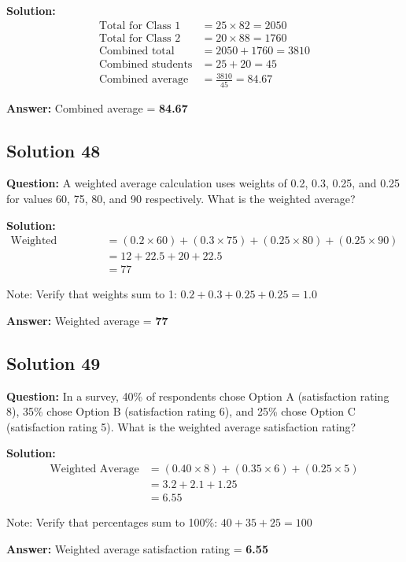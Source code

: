 \documentclass[12pt,a4paper]{article}
\begin{document}
\textbf{Solution:}
\begin{align*}
\text{Total for Class 1} &= 25 \times 82 = 2050 \\
\text{Total for Class 2} &= 20 \times 88 = 1760 \\
\text{Combined total} &= 2050 + 1760 = 3810 \\
\text{Combined students} &= 25 + 20 = 45 \\
\text{Combined average} &= \frac{3810}{45} = 84.67
\end{align*}

\textbf{Answer:} Combined average = \textbf{84.67}

\subsection*{Solution 48}
\textbf{Question:} A weighted average calculation uses weights of 0.2, 0.3, 0.25, and 0.25 for values 60, 75, 80, and 90 respectively. What is the weighted average?

\textbf{Solution:}
\begin{align*}
\text{Weighted Average} &= (0.2 \times 60) + (0.3 \times 75) + (0.25 \times 80) + (0.25 \times 90) \\
&= 12 + 22.5 + 20 + 22.5 \\
&= 77
\end{align*}

Note: Verify that weights sum to 1: $0.2 + 0.3 + 0.25 + 0.25 = 1.0$ 

\textbf{Answer:} Weighted average = \textbf{77}

\subsection*{Solution 49}
\textbf{Question:} In a survey, 40\% of respondents chose Option A (satisfaction rating 8), 35\% chose Option B (satisfaction rating 6), and 25\% chose Option C (satisfaction rating 5). What is the weighted average satisfaction rating?

\textbf{Solution:}
\begin{align*}
\text{Weighted Average} &= (0.40 \times 8) + (0.35 \times 6) + (0.25 \times 5) \\
&= 3.2 + 2.1 + 1.25 \\
&= 6.55
\end{align*}

Note: Verify that percentages sum to 100\%: $40 + 35 + 25 = 100$ 

\textbf{Answer:} Weighted average satisfaction rating = \textbf{6.55}
\end{document}

